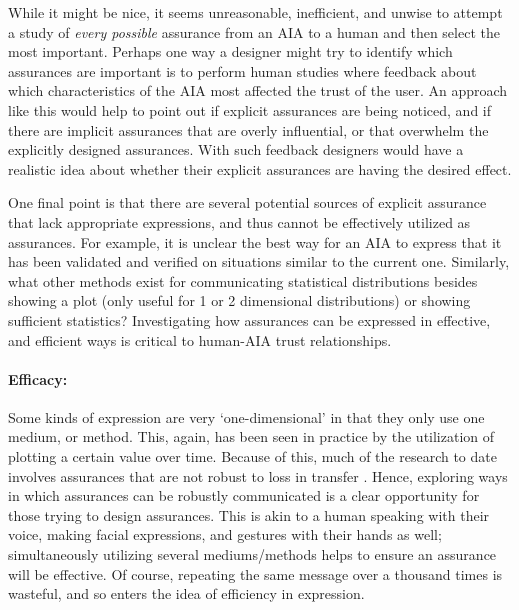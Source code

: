     While it might be nice, it seems unreasonable, inefficient, and unwise to attempt a study of \emph{every possible} assurance from an AIA to a human and then select the most important. Perhaps one way a designer might try to identify which assurances are important is to perform human studies where feedback about which characteristics of the AIA most affected the trust of the user. An approach like this would help to point out if explicit assurances are being noticed, and if there are implicit assurances that are overly influential, or that overwhelm the explicitly designed assurances. With such feedback designers would have a realistic idea about whether their explicit assurances are having the desired effect. 

    One final point is that there are several potential sources of explicit assurance that lack appropriate expressions, and thus cannot be effectively utilized as assurances. For example, it is unclear the best way for an AIA to express that it has been validated and verified on situations similar to the current one. Similarly, what other methods exist for communicating statistical distributions besides showing a plot (only useful for 1 or 2 dimensional distributions) or showing sufficient statistics? Investigating how assurances can be expressed in effective, and efficient ways is critical to human-AIA trust relationships.

    \paragraph{Efficacy:} Some kinds of expression are very `one-dimensional' in that they only use one medium, or method. This, again, has been seen in practice by the utilization of plotting a certain value over time. Because of this, much of the research to date involves assurances that are not robust to loss in transfer . Hence, exploring ways in which assurances can be robustly communicated is a clear opportunity for those trying to design assurances. This is akin to a human speaking with their voice, making facial expressions, and gestures with their hands as well; simultaneously utilizing several mediums/methods helps to ensure an assurance will be effective. Of course, repeating the same message over a thousand times is wasteful, and so enters the idea of efficiency in expression.

